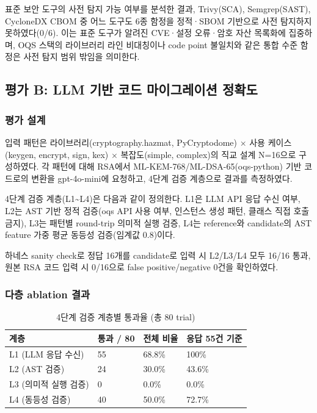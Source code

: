 표준 보안 도구의 사전 탐지 가능 여부를 분석한 결과, Trivy(SCA), Semgrep(SAST), CycloneDX CBOM 중 어느 도구도 6종 함정을 정적·SBOM 기반으로 사전 탐지하지 못하였다(0/6).
이는 표준 도구가 알려진 CVE·설정 오류·암호 자산 목록화에 집중하며, OQS 스택의 라이브러리 라인 비대칭이나 code point 불일치와 같은 통합 수준 함정은 사전 탐지 범위 밖임을 의미한다.

\subsection{평가 B: LLM 기반 코드 마이그레이션 정확도}

\subsubsection{평가 설계}

입력 패턴은 라이브러리(cryptography.hazmat, PyCryptodome) $\times$ 사용 케이스(keygen, encrypt, sign, kex) $\times$ 복잡도(simple, complex)의 직교 설계 N=16으로 구성하였다.
각 패턴에 대해 RSA에서 ML-KEM-768/ML-DSA-65(oqs-python) 기반 코드로의 변환을 gpt-4o-mini에 요청하고, 4단계 검증 계층으로 결과를 측정하였다.

4단계 검증 계층(L1\textasciitilde L4)은 다음과 같이 정의한다.
L1은 LLM API 응답 수신 여부, L2는 AST 기반 정적 검증(oqs API 사용 여부, 인스턴스 생성 패턴, 클래스 직접 호출 금지), L3는 패턴별 round-trip 의미적 실행 검증, L4는 reference와 candidate의 AST feature 가중 평균 동등성 검증(임계값 0.8)이다.

하네스 sanity check로 정답 16개를 candidate로 입력 시 L2/L3/L4 모두 16/16 통과, 원본 RSA 코드 입력 시 0/16으로 false positive/negative 0건을 확인하였다.

\subsubsection{다층 ablation 결과}

\begin{table}[htbp]
\centering
\renewcommand{\arraystretch}{1.3}
\caption{4단계 검증 계층별 통과율 (총 80 trial)}
\label{tab:llm_ablation}
\begin{tabular}{llll}
\toprule
계층 & 통과 / 80 & 전체 비율 & 응답 55건 기준 \\
\midrule
L1 (LLM 응답 수신) & 55 & 68.8\% & 100\% \\
L2 (AST 검증) & 24 & 30.0\% & 43.6\% \\
L3 (의미적 실행 검증) & 0 & 0.0\% & 0.0\% \\
L4 (동등성 검증) & 40 & 50.0\% & 72.7\% \\
\bottomrule
\end{tabular}
\end{table}

